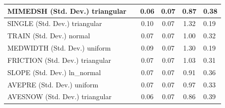 \begin{table}
\begin{center}
\begin{tabular}{|l|l|c|c|c|l|}
			\hline
			MIMEDSH (Std. Dev.) triangular &  & 0.06 & 0.07 & 0.87 & 0.38 \\
			\hline
			SINGLE (Std. Dev.) triangular &  & 0.10 & 0.07 & 1.32 & 0.19 \\
			\hline
			TRAIN (Std. Dev.) normal &  & 0.07 & 0.07 & 1.00 & 0.32 \\
			\hline
			MEDWIDTH (Std. Dev.) uniform &  & 0.09 & 0.07 & 1.30 & 0.19 \\
			\hline
			FRICTION (Std. Dev.) triangular &  & 0.07 & 0.07 & 1.03 & 0.31 \\
			\hline
			SLOPE (Std. Dev.) ln_normal &  & 0.07 & 0.07 & 0.91 & 0.36 \\
			\hline
			AVEPRE (Std. Dev.) uniform &  & 0.07 & 0.07 & 0.97 & 0.33 \\
			\hline
			AVESNOW (Std. Dev.) triangular &  & 0.06 & 0.07 & 0.86 & 0.39 \\
			\hline
		\end{tabular}
	\end{center}
\end{table}